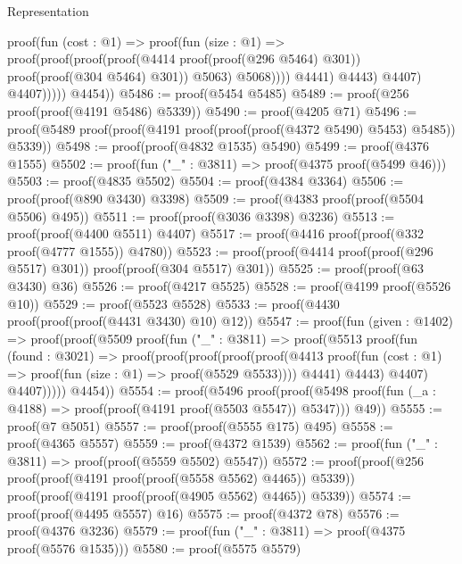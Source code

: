 \begin{lexlean}{Representation}
\begin{coremodule}
                              proof(fun (cost : @1) =>
                                proof(fun (size : @1) =>
                                  proof(proof(proof(proof(@4414 proof(proof(@296 @5464) @301))
                                          proof(proof(@304 @5464) @301))
                                        @5063)
                                      @5068))))
                            @4441)
                          @4443)
                        @4407)
                      @4407)))))
        @4454))
@5486 := proof(@5454 @5485)
@5489 := proof(@256 proof(proof(@4191 @5486) @5339))
@5490 := proof(@4205 @71)
@5496 := proof(@5489 proof(proof(@4191 proof(proof(proof(@4372 @5490) @5453) @5485)) @5339))
@5498 := proof(proof(@4832 @1535) @5490)
@5499 := proof(@4376 @1555)
@5502 := proof(fun ("_" : @3811) => proof(@4375 proof(@5499 @46)))
@5503 := proof(@4835 @5502)
@5504 := proof(@4384 @3364)
@5506 := proof(proof(@890 @3430) @3398)
@5509 := proof(@4383 proof(proof(@5504 @5506) @495))
@5511 := proof(proof(@3036 @3398) @3236)
@5513 := proof(proof(@4400 @5511) @4407)
@5517 := proof(@4416 proof(proof(@332 proof(@4777 @1555)) @4780))
@5523 := proof(proof(@4414 proof(proof(@296 @5517) @301)) proof(proof(@304 @5517) @301))
@5525 := proof(proof(@63 @3430) @36)
@5526 := proof(@4217 @5525)
@5528 := proof(@4199 proof(@5526 @10))
@5529 := proof(@5523 @5528)
@5533 := proof(@4430 proof(proof(proof(@4431 @3430) @10) @12))
@5547 := proof(fun (given : @1402) =>
    proof(proof(@5509
          proof(fun ("_" : @3811) =>
            proof(@5513
                proof(fun (found : @3021) =>
                  proof(proof(proof(proof(proof(@4413
                              proof(fun (cost : @1) =>
                                proof(fun (size : @1) => proof(@5529 @5533))))
                            @4441)
                          @4443)
                        @4407)
                      @4407)))))
        @4454))
@5554 := proof(@5496
      proof(proof(@5498 proof(fun (_a : @4188) => proof(proof(@4191 proof(@5503 @5547)) @5347)))
          @49))
@5555 := proof(@7 @5051)
@5557 := proof(proof(@5555 @175) @495)
@5558 := proof(@4365 @5557)
@5559 := proof(@4372 @1539)
@5562 := proof(fun ("_" : @3811) => proof(proof(@5559 @5502) @5547))
@5572 := proof(proof(@256 proof(proof(@4191 proof(proof(@5558 @5562) @4465)) @5339))
      proof(proof(@4191 proof(proof(@4905 @5562) @4465)) @5339))
@5574 := proof(proof(@4495 @5557) @16)
@5575 := proof(@4372 @78)
@5576 := proof(@4376 @3236)
@5579 := proof(fun ("_" : @3811) => proof(@4375 proof(@5576 @1535)))
@5580 := proof(@5575 @5579)

\end{coremodule}
\end{lexlean}
